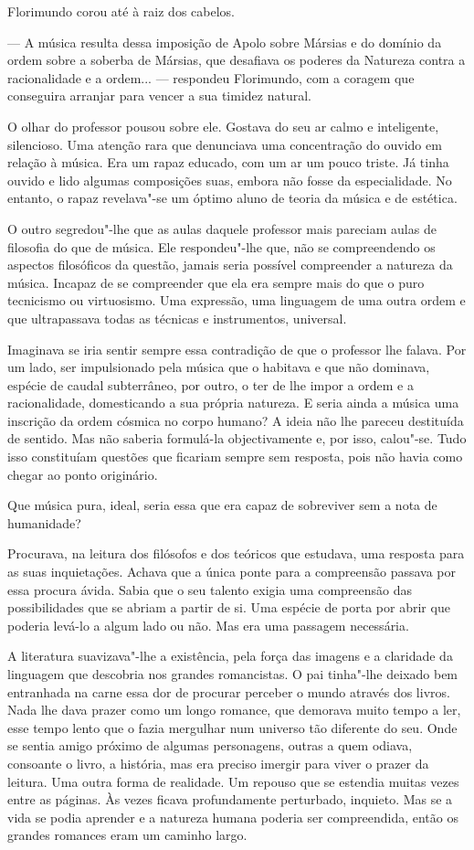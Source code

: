 Florimundo corou até à raiz dos cabelos.

--- A música resulta dessa imposição de Apolo sobre Mársias e do domínio
da ordem sobre a soberba de Mársias, que desafiava os poderes da
Natureza contra a racionalidade e a ordem... --- respondeu Florimundo, com
a coragem que conseguira arranjar para vencer a sua timidez natural.

O olhar do professor pousou sobre ele. Gostava do seu ar calmo e
inteligente, silencioso. Uma atenção rara que denunciava uma
concentração do ouvido em relação à música. Era um rapaz educado, com um
ar um pouco triste. Já tinha ouvido e lido algumas composições suas,
embora não fosse da especialidade. No entanto, o rapaz revelava"-se um
óptimo aluno de teoria da música e de estética.

O outro segredou"-lhe que as aulas daquele professor mais pareciam aulas
de filosofia do que de música. Ele respondeu"-lhe que, não se
compreendendo os aspectos filosóficos da questão, jamais seria possível
compreender a natureza da música. Incapaz de se compreender que ela era
sempre mais do que o puro tecnicismo ou virtuosismo. Uma expressão, uma
linguagem de uma outra ordem e que ultrapassava todas as técnicas e
instrumentos, universal.

Imaginava se iria sentir sempre essa contradição de que o professor lhe
falava. Por um lado, ser impulsionado pela música que o habitava e que
não dominava, espécie de caudal subterrâneo, por outro, o ter de lhe
impor a ordem e a racionalidade, domesticando a sua própria natureza. E
seria ainda a música uma inscrição da ordem cósmica no corpo humano? A
ideia não lhe pareceu destituída de sentido. Mas não saberia formulá-la
objectivamente e, por isso, calou"-se. Tudo isso constituíam questões que
ficariam sempre sem resposta, pois não havia como chegar ao ponto
originário.

Que música pura, ideal, seria essa que era capaz de sobreviver sem a
nota de humanidade?

Procurava, na leitura dos filósofos e dos teóricos que estudava, uma
resposta para as suas inquietações. Achava que a única ponte para a
compreensão passava por essa procura ávida. Sabia que o seu talento
exigia uma compreensão das possibilidades que se abriam a partir de si.
Uma espécie de porta por abrir que poderia levá-lo a algum lado ou não.
Mas era uma passagem necessária.

A literatura suavizava"-lhe a existência, pela força das imagens e a
claridade da linguagem que descobria nos grandes romancistas. O pai
tinha"-lhe deixado bem entranhada na carne essa dor de procurar perceber
o mundo através dos livros. Nada lhe dava prazer como um longo romance,
que demorava muito tempo a ler, esse tempo lento que o fazia mergulhar
num universo tão diferente do seu. Onde se sentia amigo próximo de
algumas personagens, outras a quem odiava, consoante o livro, a
história, mas era preciso imergir para viver o prazer da leitura. Uma
outra forma de realidade. Um repouso que se estendia muitas vezes entre
as páginas. Às vezes ficava profundamente perturbado, inquieto. Mas se a
vida se podia aprender e a natureza humana poderia ser compreendida,
então os grandes romances eram um caminho largo.


